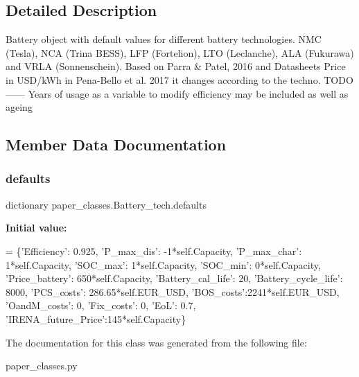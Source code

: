 \subsection{Detailed Description}
\begin{DoxyVerb}Battery object with default values for different battery technologies.
NMC (Tesla), NCA (Trina BESS), LFP (Fortelion), LTO (Leclanche),
ALA (Fukurawa) and VRLA (Sonnenschein).
Based on Parra & Patel, 2016 and Datasheets
Price in USD/kWh in Pena-Bello et al. 2017 it changes according to the techno.
TODO
------
Years of usage as a variable to modify efficiency may be included as well as ageing\end{DoxyVerb}
 

\subsection{Member Data Documentation}
\mbox{\label{classpaper__classes_1_1_battery__tech_a274d978b477b44f9beddbe188352c406}} 
\subsubsection{\texorpdfstring{defaults}{defaults}}
{\footnotesize\ttfamily dictionary paper\+\_\+classes.\+Battery\+\_\+tech.\+defaults\hspace{0.3cm}{\ttfamily [static]}}

{\bfseries Initial value\+:}
\begin{DoxyCode}
=  \{\textcolor{stringliteral}{'Efficiency'}: 0.925,
                \textcolor{stringliteral}{'P\_max\_dis'}: -1*self.Capacity,
                \textcolor{stringliteral}{'P\_max\_char'}: 1*self.Capacity,
                \textcolor{stringliteral}{'SOC\_max'}: 1*self.Capacity,
                \textcolor{stringliteral}{'SOC\_min'}: 0*self.Capacity,
                \textcolor{stringliteral}{'Price\_battery'}: 650*self.Capacity,
                \textcolor{stringliteral}{'Battery\_cal\_life'}: 20,
                \textcolor{stringliteral}{'Battery\_cycle\_life'}: 8000,
                \textcolor{stringliteral}{'PCS\_costs'}: 286.65*self.EUR\_USD,
                \textcolor{stringliteral}{'BOS\_costs'}:2241*self.EUR\_USD,
                \textcolor{stringliteral}{'OandM\_costs'}: 0,
                \textcolor{stringliteral}{'Fix\_costs'}: 0,
                \textcolor{stringliteral}{'EoL'}: 0.7,
                \textcolor{stringliteral}{'IRENA\_future\_Price'}:145*self.Capacity\}
\end{DoxyCode}


The documentation for this class was generated from the following file\+:\begin{DoxyCompactItemize}
\item 
paper\+\_\+classes.\+py\end{DoxyCompactItemize}
